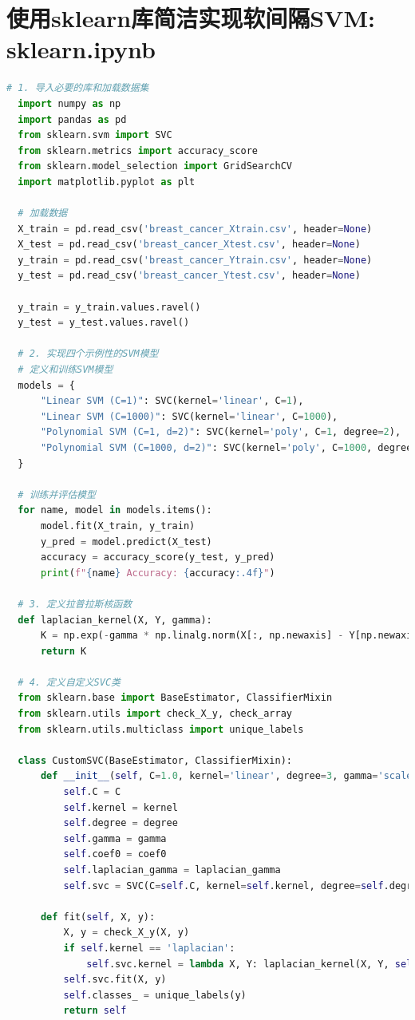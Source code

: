 \documentclass[12pt]{article}
\begin{document}
\section{使用sklearn库简洁实现软间隔SVM: sklearn.ipynb}
\begin{lstlisting}[language=python]
  # 1. 导入必要的库和加载数据集
  import numpy as np
  import pandas as pd
  from sklearn.svm import SVC
  from sklearn.metrics import accuracy_score
  from sklearn.model_selection import GridSearchCV
  import matplotlib.pyplot as plt
  
  # 加载数据
  X_train = pd.read_csv('breast_cancer_Xtrain.csv', header=None)
  X_test = pd.read_csv('breast_cancer_Xtest.csv', header=None)
  y_train = pd.read_csv('breast_cancer_Ytrain.csv', header=None)
  y_test = pd.read_csv('breast_cancer_Ytest.csv', header=None)
  
  y_train = y_train.values.ravel()
  y_test = y_test.values.ravel()
  
  # 2. 实现四个示例性的SVM模型
  # 定义和训练SVM模型
  models = {
      "Linear SVM (C=1)": SVC(kernel='linear', C=1),
      "Linear SVM (C=1000)": SVC(kernel='linear', C=1000),
      "Polynomial SVM (C=1, d=2)": SVC(kernel='poly', C=1, degree=2),
      "Polynomial SVM (C=1000, d=2)": SVC(kernel='poly', C=1000, degree=2)
  }
  
  # 训练并评估模型
  for name, model in models.items():
      model.fit(X_train, y_train)
      y_pred = model.predict(X_test)
      accuracy = accuracy_score(y_test, y_pred)
      print(f"{name} Accuracy: {accuracy:.4f}")
  
  # 3. 定义拉普拉斯核函数
  def laplacian_kernel(X, Y, gamma):
      K = np.exp(-gamma * np.linalg.norm(X[:, np.newaxis] - Y[np.newaxis, :], axis=2))
      return K
  
  # 4. 定义自定义SVC类
  from sklearn.base import BaseEstimator, ClassifierMixin
  from sklearn.utils import check_X_y, check_array
  from sklearn.utils.multiclass import unique_labels
  
  class CustomSVC(BaseEstimator, ClassifierMixin):
      def __init__(self, C=1.0, kernel='linear', degree=3, gamma='scale', coef0=0.0, laplacian_gamma=1.0):
          self.C = C
          self.kernel = kernel
          self.degree = degree
          self.gamma = gamma
          self.coef0 = coef0
          self.laplacian_gamma = laplacian_gamma
          self.svc = SVC(C=self.C, kernel=self.kernel, degree=self.degree, gamma=self.gamma, coef0=self.coef0)
      
      def fit(self, X, y):
          X, y = check_X_y(X, y)
          if self.kernel == 'laplacian':
              self.svc.kernel = lambda X, Y: laplacian_kernel(X, Y, self.laplacian_gamma)
          self.svc.fit(X, y)
          self.classes_ = unique_labels(y)
          return self
      

\end{lstlisting}
\end{document}
